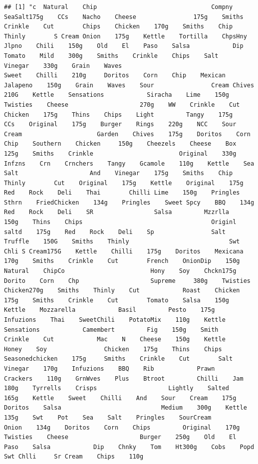 \documentclass[
]{article}
\begin{document}
\begin{verbatim}
## [1] "c  Natural    Chip                                Compny    SeaSalt175g    CCs    Nacho    Cheese                175g    Smiths    Crinkle    Cut        Chips    Chicken    170g    Smiths    Chip    Thinly        S Cream Onion    175g    Kettle    Tortilla    ChpsHny Jlpno    Chili    150g    Old    El    Paso    Salsa            Dip    Tomato    Mild    300g    Smiths    Crinkle    Chips    Salt         Vinegar    330g    Grain    Waves                                    Sweet    Chilli    210g     Doritos    Corn    Chip    Mexican    Jalapeno    150g    Grain    Waves    Sour                Cream Chives    210G    Kettle    Sensations            Siracha    Lime    150g    Twisties    Cheese                    270g    WW    Crinkle    Cut                        Chicken    175g    Thins    Chips    Light         Tangy    175g    CCs    Original    175g    Burger    Rings    220g    NCC    Sour    Cream                     Garden    Chives    175g    Doritos    Corn    Chip    Southern    Chicken     150g    Cheezels    Cheese    Box    125g    Smiths    Crinkle                        Original    330g    Infzns    Crn    Crnchers    Tangy    Gcamole    110g    Kettle    Sea    Salt                    And    Vinegar    175g    Smiths    Chip    Thinly        Cut    Original    175g    Kettle    Original    175g    Red    Rock    Deli    Thai        Chilli Lime    150g    Pringles    Sthrn    FriedChicken    134g    Pringles    Sweet Spcy    BBQ    134g    Red    Rock    Deli    SR                 Salsa         Mzzrlla    150g    Thins    Chips                                    Originl    saltd    175g    Red    Rock    Deli    Sp                Salt         Truffle    150G    Smiths    Thinly                            Swt    Chli S Cream175G    Kettle    Chilli    175g    Doritos    Mexicana                170g    Smiths    Crinkle    Cut        French    OnionDip    150g    Natural    ChipCo                        Hony    Soy    Chckn175g    Dorito    Corn    Chp                    Supreme     380g    Twisties    Chicken270g    Smiths    Thinly    Cut            Roast    Chicken    175g    Smiths    Crinkle    Cut        Tomato    Salsa    150g    Kettle    Mozzarella            Basil         Pesto    175g    Infuzions    Thai    SweetChili    PotatoMix    110g    Kettle    Sensations            Camembert         Fig    150g    Smith    Crinkle    Cut            Mac    N    Cheese    150g    Kettle    Honey    Soy                Chicken    175g    Thins    Chips    Seasonedchicken    175g     Smiths    Crinkle    Cut        Salt         Vinegar    170g    Infuzions    BBQ    Rib            Prawn    Crackers    110g    GrnWves    Plus    Btroot         Chilli    Jam    180g    Tyrrells    Crisps                    Lightly    Salted    165g    Kettle    Sweet    Chilli    And    Sour    Cream    175g    Doritos    Salsa                            Medium    300g    Kettle    135g    Swt    Pot    Sea    Salt    Pringles    SourCream        Onion    134g    Doritos    Corn    Chips         Original    170g    Twisties    Cheese                    Burger    250g    Old    El    Paso    Salsa            Dip    Chnky    Tom    Ht300g    Cobs    Popd    Swt Chlli     Sr Cream    Chips    110g  
\end{verbatim}
\end{document}
